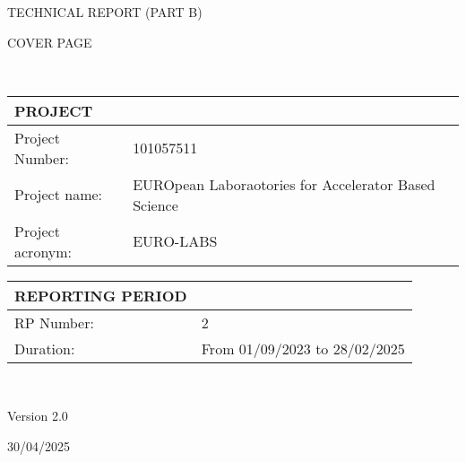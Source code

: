 %
%


\vspace*{-0.05cm}

{\fontsize{12}{15}\bf\color{mycayenne}
        \centerline{TECHNICAL REPORT (PART B)}
        
        COVER PAGE}\\%
  \setlength{\parindent}{0pt}
  
  \def\arraystretch{1.25}
  {\fontsize{9}{11}\selectfont
  \begin{tabular}[t]{!{\color{mygray}\vrule}p{.25\linewidth}!{\color{mygray}\vrule}p{.6885\linewidth}!{\color{mygray}\vrule}} \hline
    {\rule{0pt}{2.5ex}\color{myblack}\bf PROJECT} \\ \hline
    Project Number: & 101057511 \\ \hline
    Project name: & EUROpean Laboraotories for Accelerator Based Science \\ \hline
    Project acronym: & EURO-LABS \\
    \hline
  \end{tabular}

  \vspace*{1cm}
  
  \begin{tabular}[t]{!{\color{mygray}\vrule}p{.25\linewidth}!{\color{mygray}\vrule}p{.6885\linewidth}!{\color{mygray}\vrule}} \hline
    {\rule{0pt}{2.5ex}\color{myblack}\bf REPORTING PERIOD} \\ \hline
    RP Number: & 2 \\ \hline
    Duration: & From 01/09/2023 to 28/02/2025 \\ \hline
  \end{tabular}
}\\[3ex]

\begin{center}
    \vspace*{2cm}
    
    Version 2.0
  
    \vspace*{0.5cm}
    30/04/2025

    \vspace*{1.5cm}
    
\end{center}
\clearpage
\restoregeometry